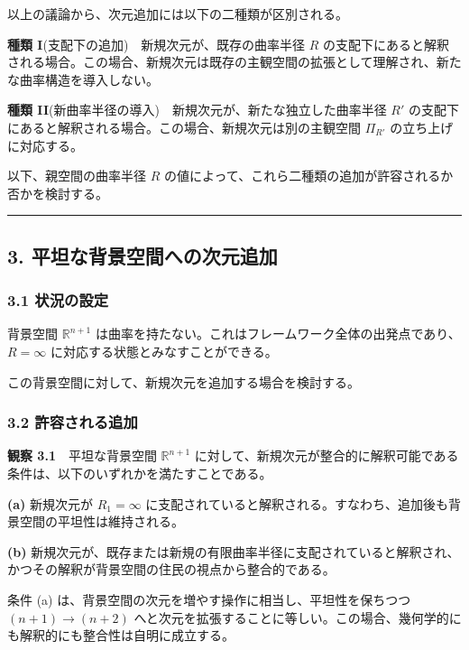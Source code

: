 \documentclass[a4paper,11pt]{ltjsarticle}
\theoremstyle{definition}
\begin{document}
以上の議論から、次元追加には以下の二種類が区別される。

\textbf{種類 I}(支配下の追加)　新規次元が、既存の曲率半径 \(R\) の支配下にあると解釈される場合。この場合、新規次元は既存の主観空間の拡張として理解され、新たな曲率構造を導入しない。

\textbf{種類 II}(新曲率半径の導入)　新規次元が、新たな独立した曲率半径 \(R'\) の支配下にあると解釈される場合。この場合、新規次元は別の主観空間 \(\Pi_{R'}\) の立ち上げに対応する。

以下、親空間の曲率半径 \(R\) の値によって、これら二種類の追加が許容されるか否かを検討する。

\begin{center}\rule{0.5\linewidth}{0.5pt}\end{center}

\subsection{3. 平坦な背景空間への次元追加}\label{ux5e73ux5766ux306aux80ccux666fux7a7aux9593ux3078ux306eux6b21ux5143ux8ffdux52a0}

\subsubsection{3.1 状況の設定}\label{ux72b6ux6cc1ux306eux8a2dux5b9a}

背景空間 \(\mathbb{R}^{n+1}\) は曲率を持たない。これはフレームワーク全体の出発点であり、\(R = \infty\) に対応する状態とみなすことができる。

この背景空間に対して、新規次元を追加する場合を検討する。

\subsubsection{3.2 許容される追加}\label{ux8a31ux5bb9ux3055ux308cux308bux8ffdux52a0}

\textbf{観察 3.1}　平坦な背景空間 \(\mathbb{R}^{n+1}\) に対して、新規次元が整合的に解釈可能である条件は、以下のいずれかを満たすことである。

\textbf{(a)} 新規次元が \(R_1 = \infty\) に支配されていると解釈される。すなわち、追加後も背景空間の平坦性は維持される。

\textbf{(b)} 新規次元が、既存または新規の有限曲率半径に支配されていると解釈され、かつその解釈が背景空間の住民の視点から整合的である。

条件 (a) は、背景空間の次元を増やす操作に相当し、平坦性を保ちつつ \((n+1) \to (n+2)\) へと次元を拡張することに等しい。この場合、幾何学的にも解釈的にも整合性は自明に成立する。
\end{document}
